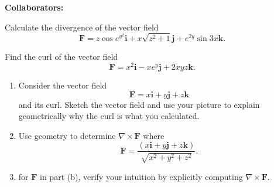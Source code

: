 \documentclass[11pt,letterpaper,boxed]{hmcpset}
\newcommand{\pn}[1]{\left( #1 \right)}
\begin{document}
\noindent\textbf{Collaborators:} 


\begin{problem}[Colley 3.4 \#4]
Calculate the divergence of the vector field
\[
	\mathbf{F} = z\cos{e^{y^2}}\mathbf{i} + x\sqrt{z^2+1}\mathbf{j} + e^{2y}\sin{3x}\mathbf{k}.
\]
\end{problem}

\begin{solution}
\vfill
\end{solution}
\newpage

\begin{problem}[Colley 3.4 \#7]
Find the curl of the vector field
\[
	\mathbf{F} = x^2\mathbf{i} - xe^y\mathbf{j} + 2xyz\mathbf{k}.
\]
\end{problem}

\begin{solution}
\vfill
\end{solution}
\newpage

\begin{problem}[Colley 3.4 \#12]
\begin{enumerate}
\item Consider the vector field
\[
	\mathbf{F} = x\mathbf{i} + y\mathbf{j} + z\mathbf{k}
\]
and its curl. Sketch the vector field and use your picture to explain geometrically why the curl is what you calculated.
\item Use geometry to determine $\nabla \times \mathbf{F}$ where
\[
	\mathbf{F} = \frac{\pn{x\mathbf{i} + y\mathbf{j} + z\mathbf{k}}}{\sqrt{x^2+y^2+z^2}}.
\]
\item for $\mathbf{F}$ in part (b), verify your intuition by explicitly computing $\nabla \times \mathbf{F}$.
\end{enumerate}
\end{problem}

\begin{solution}
\vfill
\end{solution}
\newpage
\end{document}
